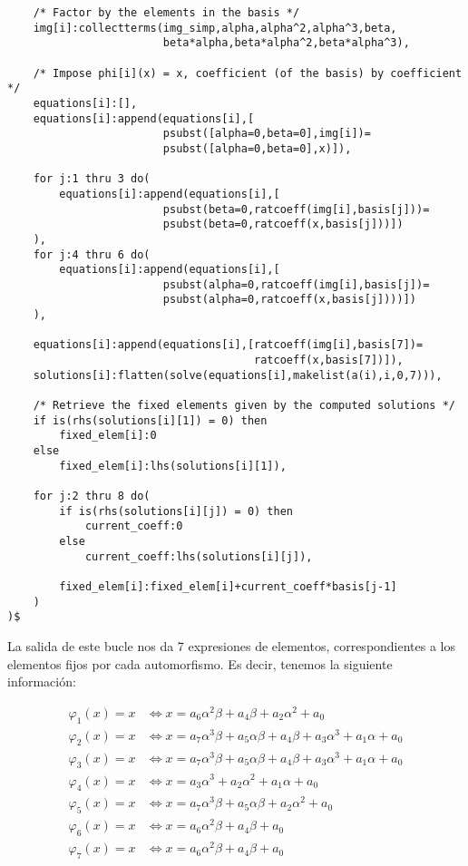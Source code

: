 \documentclass[a4paper, 11pt]{article}
\begin{document}
\begin{solucion}
\begin{verbatim}
    /* Factor by the elements in the basis */
    img[i]:collectterms(img_simp,alpha,alpha^2,alpha^3,beta,
                        beta*alpha,beta*alpha^2,beta*alpha^3),

    /* Impose phi[i](x) = x, coefficient (of the basis) by coefficient */
    equations[i]:[],
    equations[i]:append(equations[i],[
                        psubst([alpha=0,beta=0],img[i])=
                        psubst([alpha=0,beta=0],x)]),

    for j:1 thru 3 do(
        equations[i]:append(equations[i],[
                        psubst(beta=0,ratcoeff(img[i],basis[j]))=
                        psubst(beta=0,ratcoeff(x,basis[j]))])
    ),
    for j:4 thru 6 do(
        equations[i]:append(equations[i],[
                        psubst(alpha=0,ratcoeff(img[i],basis[j])=
                        psubst(alpha=0,ratcoeff(x,basis[j])))])
    ),

    equations[i]:append(equations[i],[ratcoeff(img[i],basis[7])=
                                      ratcoeff(x,basis[7])]),
    solutions[i]:flatten(solve(equations[i],makelist(a(i),i,0,7))),

    /* Retrieve the fixed elements given by the computed solutions */
    if is(rhs(solutions[i][1]) = 0) then
        fixed_elem[i]:0
    else
        fixed_elem[i]:lhs(solutions[i][1]),

    for j:2 thru 8 do(
        if is(rhs(solutions[i][j]) = 0) then
            current_coeff:0
        else
            current_coeff:lhs(solutions[i][j]),

        fixed_elem[i]:fixed_elem[i]+current_coeff*basis[j-1]
    )
)$
      \end{verbatim}
      \color{black}

      La salida de este bucle nos da 7 expresiones de elementos, correspondientes a los elementos fijos por cada automorfismo. Es decir, tenemos la siguiente información:

      \begin{align*}
          \varphi_1(x) = x &\iff x=a_6\alpha^2\beta+a_4\beta+a_2\alpha^2+a_0 \\
          \varphi_2(x) = x &\iff x=a_7\alpha^3\beta+a_5\alpha\beta+a_4\beta+a_3\alpha^3+a_1\alpha+a_0 \\
          \varphi_3(x) = x &\iff x=a_7\alpha^3\beta+a_5\alpha\beta+a_4\beta+a_3\alpha^3+a_1\alpha+a_0 \\
          \varphi_4(x) = x &\iff x=a_3\alpha^3+a_2\alpha^2+a_1\alpha+a_0 \\
          \varphi_5(x) = x &\iff x=a_7\alpha^3\beta+a_5\alpha\beta+a_2\alpha^2+a_0 \\
          \varphi_6(x) = x &\iff x=a_6\alpha^2\beta+a_4\beta+a_0 \\
          \varphi_7(x) = x &\iff x=a_6\alpha^2\beta+a_4\beta+a_0
      \end{align*}


\end{solucion}
\end{document}
